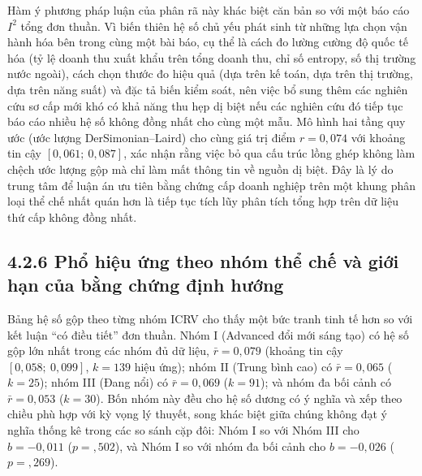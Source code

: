 \documentclass[
  a4paper,
  13pt]{extreport}
\begin{document}
Hàm ý phương pháp luận của phân rã này khác biệt căn bản so với một báo
cáo \(I^2\) tổng đơn thuần. Vì biến thiên hệ số chủ yếu phát sinh từ
những lựa chọn vận hành hóa bên trong cùng một bài báo, cụ thể là cách
đo lường cường độ quốc tế hóa (tỷ lệ doanh thu xuất khẩu trên tổng doanh
thu, chỉ số entropy, số thị trường nước ngoài), cách chọn thước đo hiệu
quả (dựa trên kế toán, dựa trên thị trường, dựa trên năng suất) và đặc
tả biến kiểm soát, nên việc bổ sung thêm các nghiên cứu sơ cấp mới khó
có khả năng thu hẹp dị biệt nếu các nghiên cứu đó tiếp tục báo cáo nhiều
hệ số không đồng nhất cho cùng một mẫu. Mô hình hai tầng quy ước (ước
lượng DerSimonian--Laird) cho cùng giá trị điểm \(r = 0{,}074\) với
khoảng tin cậy \([0{,}061;\ 0{,}087]\), xác nhận rằng việc bỏ qua cấu
trúc lồng ghép không làm chệch ước lượng gộp mà chỉ làm mất thông tin về
nguồn dị biệt. Đây là lý do trung tâm để luận án ưu tiên bằng chứng cấp
doanh nghiệp trên một khung phân loại thể chế nhất quán hơn là tiếp tục
tích lũy phân tích tổng hợp trên dữ liệu thứ cấp không đồng nhất.

\hypertarget{phux1ed5-hiux1ec7u-ux1ee9ng-theo-nhuxf3m-thux1ec3-chux1ebf-vuxe0-giux1edbi-hux1ea1n-cux1ee7a-bux1eb1ng-chux1ee9ng-ux111ux1ecbnh-hux1b0ux1edbng}{%
\subsection{4.2.6 Phổ hiệu ứng theo nhóm thể chế và giới hạn của bằng
chứng định
hướng}\label{phux1ed5-hiux1ec7u-ux1ee9ng-theo-nhuxf3m-thux1ec3-chux1ebf-vuxe0-giux1edbi-hux1ea1n-cux1ee7a-bux1eb1ng-chux1ee9ng-ux111ux1ecbnh-hux1b0ux1edbng}}

Bảng hệ số gộp theo từng nhóm ICRV cho thấy một bức tranh tinh tế hơn so
với kết luận ``có điều tiết'' đơn thuần. Nhóm I (Advanced đổi mới sáng
tạo) có hệ số gộp lớn nhất trong các nhóm đủ dữ liệu,
\(\bar{r} = 0{,}079\) (khoảng tin cậy \([0{,}058;\ 0{,}099]\),
\(k = 139\) hiệu ứng); nhóm II (Trung bình cao) có \(\bar{r} = 0{,}065\)
(\(k = 25\)); nhóm III (Đang nổi) có \(\bar{r} = 0{,}069\) (\(k = 91\));
và nhóm đa bối cảnh có \(\bar{r} = 0{,}053\) (\(k = 30\)). Bốn nhóm này
đều cho hệ số dương có ý nghĩa và xếp theo chiều phù hợp với kỳ vọng lý
thuyết, song khác biệt giữa chúng không đạt ý nghĩa thống kê trong các
so sánh cặp đôi: Nhóm I so với Nhóm III cho \(b = -0{,}011\)
(\(p = {,}502\)), và Nhóm I so với nhóm đa bối cảnh cho \(b = -0{,}026\)
(\(p = {,}269\)).
\end{document}
